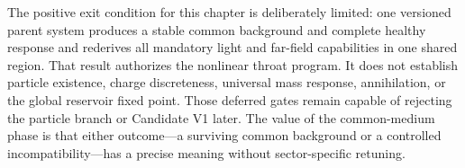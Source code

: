 The positive exit condition for this chapter is deliberately limited: one
versioned parent system produces a stable common background and complete healthy
response and rederives all mandatory light and far-field capabilities in one
shared region. That result authorizes the nonlinear throat program. It does not
establish particle existence, charge discreteness, universal mass response,
annihilation, or the global reservoir fixed point. Those deferred gates remain
capable of rejecting the particle branch or Candidate V1 later. The value of the
common-medium phase is that either outcome---a surviving common background or a
controlled incompatibility---has a precise meaning without sector-specific
retuning.
